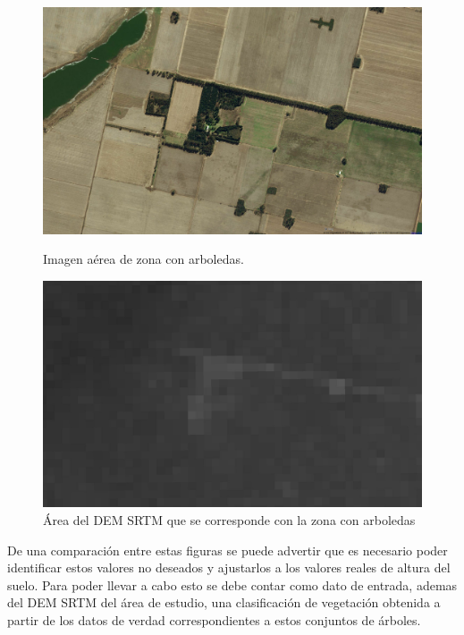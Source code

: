 \documentclass[10pt,a4paper, twoside]{report}
\begin{document}
\begin{figure}[!htb]
   \begin{minipage}{0.48\textwidth}
			\centering
			\includegraphics[width=1.0\linewidth]{imagenes/BingArboledas.jpg}
			\caption{Imagen aérea de zona con arboledas.}
			\label{BingArboledas}
   \end{minipage}\hfill
   \begin {minipage}{0.48\textwidth}
			\centering
			\includegraphics[width=1.0\linewidth]{imagenes/DEMConArboledas.jpg}
			\caption{Área del DEM SRTM que se corresponde con la zona con arboledas}
			\label{DEMConArboledas}
   \end{minipage}
\end{figure}


De una comparación entre estas figuras se puede advertir que es necesario poder identificar estos valores no deseados y ajustarlos a los valores reales de altura del suelo. Para poder llevar a cabo esto se debe contar como dato de entrada, ademas del DEM SRTM del área de estudio, una clasificación de vegetación obtenida a partir de los datos de verdad correspondientes a estos conjuntos de árboles.
\end{document}
